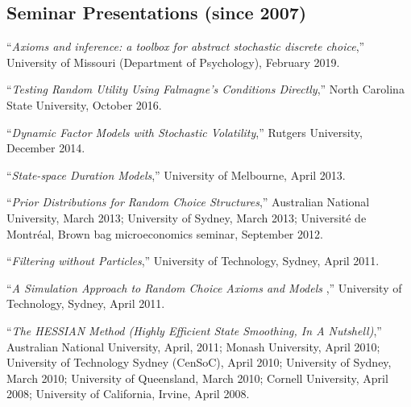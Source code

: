 \documentclass[12pt]{article}
\begin{document}




\subsection*{Seminar Presentations (since 2007)}

``{\it Axioms and inference: a toolbox for abstract stochastic discrete choice},''
University of Missouri (Department of Psychology), February 2019.

``{\it Testing Random Utility Using Falmagne's Conditions Directly},''
North Carolina State University, October 2016.

``{\it Dynamic Factor Models with Stochastic Volatility},''
Rutgers University, December 2014.

``{\it State-space Duration Models},''
University of Melbourne, April 2013.

``{\it Prior Distributions for Random Choice Structures},''
Australian National University, March 2013;
University of Sydney, March 2013;
Universit\'e de Montr\'eal, Brown bag microeconomics seminar, September 2012.

``{\it Filtering without Particles},''
University of Technology, Sydney, April 2011.

``{\it A Simulation Approach to Random Choice Axioms and Models },''
University of Technology, Sydney, April 2011.

``{\it The HESSIAN Method (Highly Efficient State Smoothing, In A Nutshell)},''
Australian National University, April, 2011;
Monash University, April 2010;
University of Technology Sydney (CenSoC), April 2010;
University of Sydney, March 2010;
University of Queensland, March 2010;
Cornell University, April 2008;
University of California, Irvine, April 2008.
\end{document}
